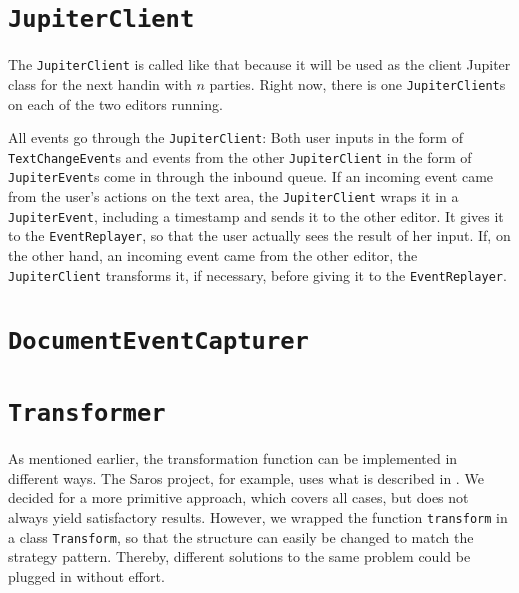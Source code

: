 \documentclass[a4paper,draft,12pt,oneside,article,table]{memoir}
\newcommand{\srcpath}{../ex09/src/main/java/ddist}
\newcommand{\inmnt}[3]{\vspace{1em}\noindent\texttt{\color{gray}File: #3}\vspace{-1em}\inputminted[tabsize=4,firstline=#1,firstnumber=#1,lastline=#2,linenos]{java}{\srcpath/#3}}
\newcommand{\mil}[1]{\texttt{#1}}
\begin{document}
\section{\mil{JupiterClient}}

The \mil{JupiterClient} is called like that because it will be used as
the client Jupiter class for the next handin with $n$ parties. Right
now, there is one \mil{JupiterClient}s on each of the two editors
running.

All events go through the \mil{JupiterClient}: Both user inputs in the
form of \mil{TextChangeEvent}s and events from the other
\mil{JupiterClient} in the form of \mil{JupiterEvent}s come in through
the inbound queue.  If an incoming event came from the user's actions on
the text area, the \mil{JupiterClient} wraps it in a \mil{JupiterEvent},
including a timestamp and sends it to the other editor. It gives it
to the \mil{EventReplayer}, so that the user actually sees the result of
her input. If, on the other hand, an incoming event came from the other
editor, the \mil{JupiterClient} transforms it, if necessary, before
giving it to the \mil{EventReplayer}.


\section{\mil{DocumentEventCapturer}}


\section{\mil{Transformer}}

As mentioned earlier, the transformation function can be implemented in
different ways. The Saros project, for example, uses what is described
in \cite{Transform}. We decided for a more primitive approach, which
covers all cases, but does not always yield satisfactory results.
However, we wrapped the function \mil{transform} in a class
\mil{Transform}, so that the structure can easily be changed to match
the strategy pattern. Thereby, different solutions to the same problem
could be plugged in without effort.
\end{document}
